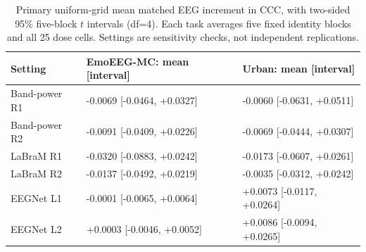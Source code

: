 \begin{table}[t]
\centering\small
\caption{Primary uniform-grid mean matched EEG increment in CCC, with two-sided 95\% five-block $t$ intervals (df=4). Each task averages five fixed identity blocks and all 25 dose cells. Settings are sensitivity checks, not independent replications.}
\label{tab:primary-v13}
\begin{tabular}{@{}lll@{}}
\toprule
Setting & EmoEEG-MC: mean [interval] & Urban: mean [interval] \\
\midrule
Band-power R1 & -0.0069 [-0.0464, +0.0327] & -0.0060 [-0.0631, +0.0511] \\
Band-power R2 & -0.0091 [-0.0409, +0.0226] & -0.0069 [-0.0444, +0.0307] \\
LaBraM R1 & -0.0320 [-0.0883, +0.0242] & -0.0173 [-0.0607, +0.0261] \\
LaBraM R2 & -0.0137 [-0.0492, +0.0219] & -0.0035 [-0.0312, +0.0242] \\
EEGNet L1 & -0.0001 [-0.0065, +0.0064] & +0.0073 [-0.0117, +0.0264] \\
EEGNet L2 & +0.0003 [-0.0046, +0.0052] & +0.0086 [-0.0094, +0.0265] \\
\bottomrule
\end{tabular}
\end{table}
